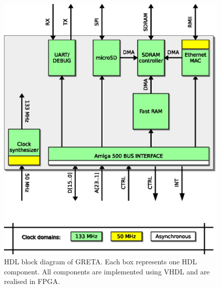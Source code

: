 \documentclass[a4paper]{report}
\begin{document}
\begin{figure}
\centering
\includegraphics{hdl_overview.eps}
\caption{HDL block diagram of GRETA. Each box represents one
HDL component. All components are implemented using VHDL and
are realised in FPGA.}
\label{hdl_overview}
\end{figure}
\end{document}
